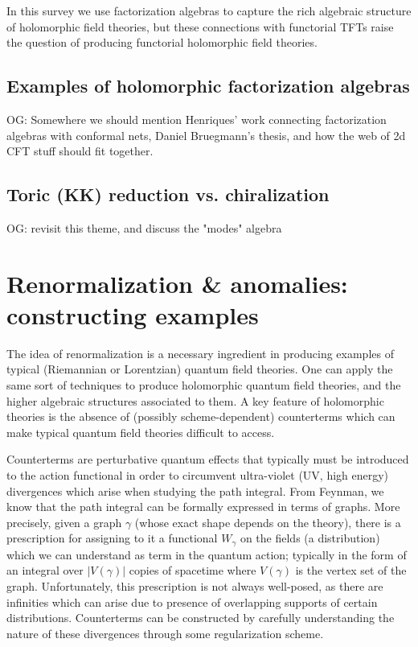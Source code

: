 \documentclass[11pt]{amsart}
\def\owen#1{{\textcolor{violet!50!black}{OG: {#1}}}}
\begin{document}
In this survey we use factorization algebras to capture the rich algebraic structure of holomorphic field theories,
but these connections with functorial TFTs raise the question of producing functorial holomorphic field theories.

\subsection{Examples of holomorphic factorization algebras}

\owen{Somewhere we should mention Henriques' work connecting factorization algebras with conformal nets,
Daniel Bruegmann's thesis, and how the web of 2d CFT stuff should fit together.}


\subsection{Toric (KK) reduction vs. chiralization}

\owen{revisit this theme, and discuss the "modes" algebra}

\section{Renormalization \& anomalies: constructing examples}
\label{sec: renorm}

The idea of renormalization is a necessary ingredient in producing examples of typical (Riemannian or Lorentzian) quantum field theories.
One can apply the same sort of techniques to produce holomorphic quantum field theories, and the higher algebraic structures associated to them.
A key feature of holomorphic theories is the absence of (possibly scheme-dependent) counterterms which can make typical quantum field theories difficult to access.

Counterterms are perturbative quantum effects that typically must be introduced to the action functional in order to circumvent ultra-violet (UV, high energy) divergences which arise when studying the path integral.
From Feynman, we know that the path integral can be formally expressed in terms of graphs. 
More precisely, given a graph $\gamma$ (whose exact shape depends on the theory), there is a prescription for assigning to it a functional $W_\gamma$ on the fields (a distribution) which we can understand as term in the quantum action; typically in the form of an integral over $|V(\gamma)|$ copies of spacetime where $V(\gamma)$ is the vertex set of the graph.
Unfortunately, this prescription is not always well-posed, as there are infinities which can arise due to presence of overlapping supports of certain distributions.
Counterterms can be constructed by carefully understanding the nature of these divergences through some regularization scheme.
\end{document}
